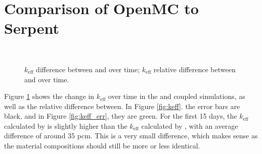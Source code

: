\section{Comparison of OpenMC to Serpent}
\label{sec:openmc-vs-serpent}

\begin{figure}[htpb]
    \centering
    \\
    \caption[$k_\text{eff}$ difference between \OpenMC and \SerpentTWO over time]{
         $k_\text{eff}$ difference between \OpenMC and \SerpentTWO over time;
         $k_\text{eff}$ relative difference between \OpenMC and \SerpentTWO 
        over time.
    }
    \label{fig:keff_sum}
\end{figure}

Figure \ref{fig:keff_sum} shows the change in $k_\text{eff}$ over time in the \OpenMC and \SerpentTWO
coupled simulations, as well as the relative difference between.
In Figure \ref{fig:keff}. the error bars are black, and in Figure
\ref{fig:keff_err}, they are green. For the first 15 days, the
$k_\text{eff}$ calculated by \OpenMC is slightly  higher than the 
$k_\text{eff}$ calculated by \SerpentTWO, with an average difference of around 35 pcm.
This is a very small difference, which makes sense as the material compositions should still
be more or less identical.

